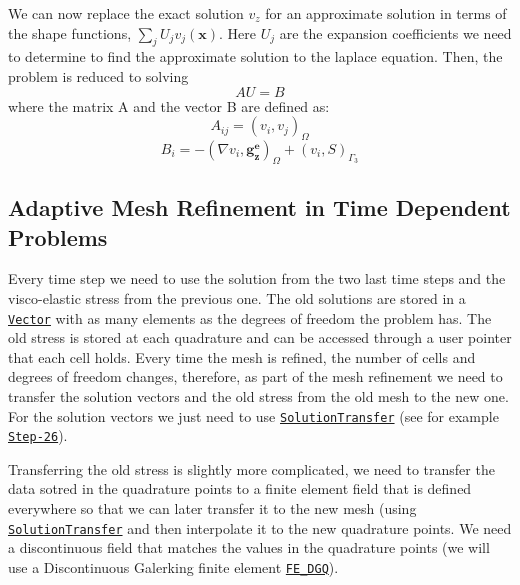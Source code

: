 We can now replace the exact solution $ v_z $ for an approximate solution in terms of the shape functions, $ \sum_{j} U_j v_j(\boldsymbol{x}) $. Here $U_j$ are the expansion coefficients we need to determine to find the approximate solution to the laplace equation. Then, the problem is reduced to solving \[AU=B\] where the matrix A and the vector B are defined as\-: \[A_{ij} = (v_i,v_j)_{\Omega}\] \[B_i = -(\nabla v_i, \boldsymbol{g^e_z})_\Omega + (v_i, S)_{\Gamma_3} \]\hypertarget{index_adaptive_refinement}{}\subsection{Adaptive Mesh Refinement in Time Dependent Problems}\label{index_adaptive_refinement}
Every time step we need to use the solution from the two last time steps and the visco-\/elastic stress from the previous one. The old solutions are stored in a \href{https://www.dealii.org/8.4.0/doxygen/deal.II/classVector.html}{\tt Vector} with as many elements as the degrees of freedom the problem has. The old stress is stored at each quadrature and can be accessed through a user pointer that each cell holds. Every time the mesh is refined, the number of cells and degrees of freedom changes, therefore, as part of the mesh refinement we need to transfer the solution vectors and the old stress from the old mesh to the new one. For the solution vectors we just need to use \href{https://www.dealii.org/8.4.0/doxygen/deal.II/classSolutionTransfer.html}{\tt Solution\-Transfer} (see for example \href{https://www.dealii.org/8.2.0/doxygen/deal.II/step_26.html#codeHeatEquationrefine_meshcode}{\tt Step-\/26}).

Transferring the old stress is slightly more complicated, we need to transfer the data sotred in the quadrature points to a finite element field that is defined everywhere so that we can later transfer it to the new mesh (using \href{https://www.dealii.org/8.4.0/doxygen/deal.II/classSolutionTransfer.html}{\tt Solution\-Transfer} and then interpolate it to the new quadrature points. We need a discontinuous field that matches the values in the quadrature points (we will use a Discontinuous Galerking finite element \href{https://www.dealii.org/8.2.0/doxygen/deal.II/classFE__DGQ.html}{\tt F\-E\-\_\-\-D\-G\-Q}). 